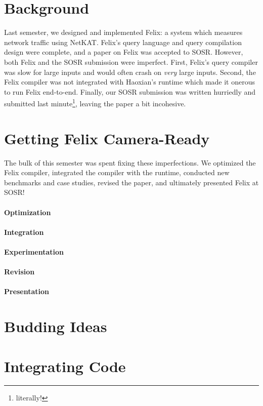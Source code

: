 \section{Background}
Last semester, we designed and implemented Felix: a system which measures
network traffic using NetKAT. Felix's query language and query compilation
design were complete, and a paper on Felix was accepted to SOSR. However,
both Felix and the SOSR submission were imperfect. First, Felix's query
compiler was slow for large inputs and would often crash on \emph{very} large
inputs. Second, the Felix compiler was not integrated with Haoxian's runtime
which made it onerous to run Felix end-to-end. Finally, our SOSR submission was
written hurriedly and submitted last minute\footnote{literally!}, leaving the
paper a bit incohesive.

\section{Getting Felix Camera-Ready}
The bulk of this semester was spent fixing these imperfections. We optimized
the Felix compiler, integrated the compiler with the runtime, conducted new
benchmarks and case studies, revised the paper, and ultimately presented Felix
at SOSR!

\paragraph{Optimization}

\paragraph{Integration}

\paragraph{Experimentation}

\paragraph{Revision}

\paragraph{Presentation}

\section{Budding Ideas}

\section{Integrating Code}
